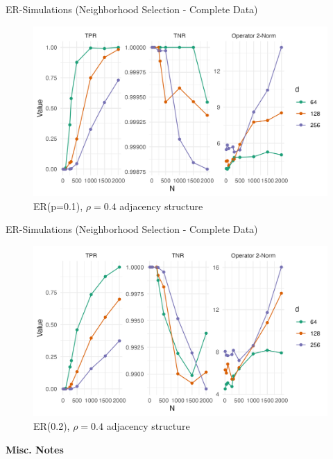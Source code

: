 \documentclass{beamer}
\begin{document}
\begin{frame}{ER-Simulations (Neighborhood Selection - Complete Data)}
    \begin{figure}
        \centering 
        \includegraphics[scale=0.65]{glasso_complete_ERmb_FixN_1.png}
        \caption{ER(p=0.1), $\rho=0.4$ adjacency structure}
    \end{figure}
\end{frame}


\begin{frame}{ER-Simulations (Neighborhood Selection - Complete Data)}
    \begin{figure}
        \centering 
        \includegraphics[scale=0.65]{glasso_complete_ERmb_FixN_2.png}
        \caption{ER(0.2), $\rho=0.4$ adjacency structure}
    \end{figure}
\end{frame}



\begin{frame}{}
    \bf{\Large Misc. Notes}    
\end{frame}
    
\end{document}
